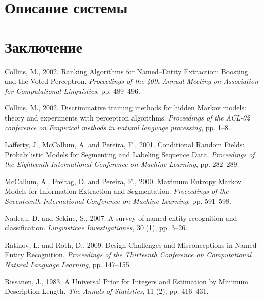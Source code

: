 \documentclass[12pt,a4paper]{article}
\begin{document}
\clearpage
\section{Описание системы}

\clearpage
\section{Заключение}

\clearpage
\begin{thebibliography}{9}


Collins, M., 2002.
Ranking Algorithms for Named–Entity Extraction:
Boosting and the Voted Perceptron.
\textit{Proceedings of the 40th Annual Meeting on Association for
Computational Linguistics}, pp. 489–496.

Collins, M., 2002.
Discriminative training methods for hidden Markov models:
theory and experiments with perceptron algorithms.
\textit{Proceedings of the ACL-02 conference on Empirical methods in
natural language processing}, pp. 1–8.

Lafferty, J., McCallum, A. and Pereira, F., 2001.
Conditional Random Fields: Probabilistic Models for Segmenting and
Labeling Sequence Data. \textit{Proceedings of the Eighteenth
International Conference on Machine Learning}, pp. 282–289.

McCallum, A., Freitag, D. and Pereira, F., 2000.
Maximum Entropy Markov Models for Information Extraction and
Segmentation. \textit{Proceedings of the Seventeenth International
Conference on Machine Learning}, pp. 591–598.

Nadeau, D. and Sekine, S., 2007.
A survey of named entity recognition and classification.
\textit{Lingvisticae Investigationes}, 30 (1), pp. 3–26.

Ratinov, L. and Roth, D., 2009.
Design Challenges and Misconceptions in Named Entity Recognition.
\textit{Proceedings of the Thirteenth Conference on Computational
Natural Language Learning}, pp. 147–155.

Rissanen, J., 1983.
A Universal Prior for Integers and Estimation by Minimum Description
Length. \textit{The Annals of Statistics}, 11 (2), pp. 416–431.

\end{thebibliography}
\end{document}
